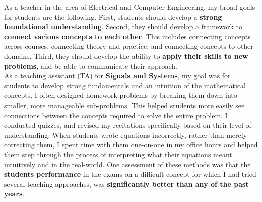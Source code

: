 \documentclass[10pt]{article}
\begin{document}
As a teacher in the area of Electrical and Computer Engineering, my broad goals for students are the following. %
First, students should develop a \textbf{strong foundational understanding}. Second, they should develop a framework to \textbf{connect various concepts to each other}. This includes connecting concepts across courses, connecting theory and practice, and connecting concepts to other domains. Third, they should develop the ability to \textbf{apply their skills to new problems}, and be able to communicate their approach. \\%


As a teaching assistant (TA) for \textbf{Signals and Systems}, my goal was for students to develop strong fundamentals and an intuition of the mathematical concepts. 
I often designed homework problems by breaking them down into smaller, more manageable sub-problems. %
This helped students more easily see connections between the concepts required to solve the entire problem.
I conducted quizzes, and revised my recitations specifically based on their level of understanding. 
When students wrote equations incorrectly, rather than merely correcting them, I spent time with them one-on-one in my office hours and helped them step through the process of interpreting what their equations meant intuitively and in the real-world. 
One assessment of these methods was that the \textbf{students performance} in the exams on a difficult concept for which I had tried several teaching approaches, was \textbf{significantly better than any of the past years}. \\
\end{document}
